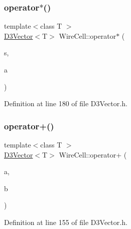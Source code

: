 \subsubsection{\texorpdfstring{operator$\ast$()}{operator*()}\hspace{0.1cm}{\footnotesize\ttfamily [3/3]}}
{\footnotesize\ttfamily template$<$class T $>$ \\
\hyperlink{class_wire_cell_1_1_d3_vector}{D3\+Vector}$<$T$>$ Wire\+Cell\+::operator$\ast$ (\begin{DoxyParamCaption}\item[{T}]{s,  }\item[{const \hyperlink{class_wire_cell_1_1_d3_vector}{D3\+Vector}$<$ T $>$}]{a }\end{DoxyParamCaption})}



Definition at line 180 of file D3\+Vector.\+h.

\mbox{\label{namespace_wire_cell_a75ea0ed7ca0e2da14f517e19859dffce}} 
\subsubsection{\texorpdfstring{operator+()}{operator+()}\hspace{0.1cm}{\footnotesize\ttfamily [1/2]}}
{\footnotesize\ttfamily template$<$class T $>$ \\
\hyperlink{class_wire_cell_1_1_d3_vector}{D3\+Vector}$<$T$>$ Wire\+Cell\+::operator+ (\begin{DoxyParamCaption}\item[{const \hyperlink{class_wire_cell_1_1_d3_vector}{D3\+Vector}$<$ T $>$}]{a,  }\item[{const \hyperlink{class_wire_cell_1_1_d3_vector}{D3\+Vector}$<$ T $>$}]{b }\end{DoxyParamCaption})}



Definition at line 155 of file D3\+Vector.\+h.

